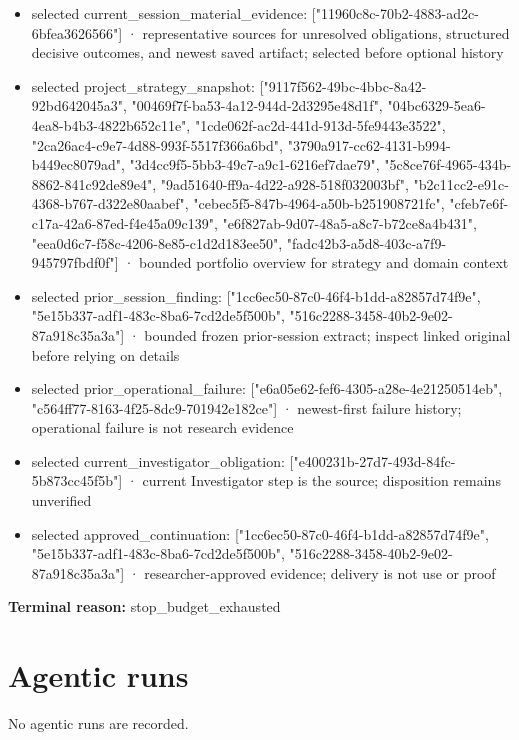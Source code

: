 \documentclass[11pt]{article}
\begin{document}
\begin{itemize}
\item selected current\_session\_material\_evidence: ["11960c8c-70b2-4883-ad2c-6bfea3626566"] · representative sources for unresolved obligations, structured decisive outcomes, and newest saved artifact; selected before optional history
\item selected project\_strategy\_snapshot: ["9117f562-49bc-4bbc-8a42-92bd642045a3", "00469f7f-ba53-4a12-944d-2d3295e48d1f", "04bc6329-5ea6-4ea8-b4b3-4822b652c11e", "1cde062f-ac2d-441d-913d-5fe9443e3522", "2ca26ac4-c9e7-4d88-993f-5517f366a6bd", "3790a917-cc62-4131-b994-b449ec8079ad", "3d4cc9f5-5bb3-49c7-a9c1-6216ef7dae79", "5c8ce76f-4965-434b-8862-841c92de89e4", "9ad51640-ff9a-4d22-a928-518f032003bf", "b2c11cc2-e91c-4368-b767-d322e80aabef", "cebec5f5-847b-4964-a50b-b251908721fc", "cfeb7e6f-c17a-42a6-87ed-f4e45a09c139", "e6f827ab-9d07-48a5-a8c7-b72ce8a4b431", "eea0d6c7-f58c-4206-8e85-c1d2d183ee50", "fadc42b3-a5d8-403c-a7f9-945797fbdf0f"] · bounded portfolio overview for strategy and domain context
\item selected prior\_session\_finding: ["1cc6ec50-87c0-46f4-b1dd-a82857d74f9e", "5e15b337-adf1-483c-8ba6-7cd2de5f500b", "516c2288-3458-40b2-9e02-87a918c35a3a"] · bounded frozen prior-session extract; inspect linked original before relying on details
\item selected prior\_operational\_failure: ["e6a05e62-fef6-4305-a28e-4e21250514eb", "c564ff77-8163-4f25-8dc9-701942e182ce"] · newest-first failure history; operational failure is not research evidence
\item selected current\_investigator\_obligation: ["e400231b-27d7-493d-84fc-5b873cc45f5b"] · current Investigator step is the source; disposition remains unverified
\item selected approved\_continuation: ["1cc6ec50-87c0-46f4-b1dd-a82857d74f9e", "5e15b337-adf1-483c-8ba6-7cd2de5f500b", "516c2288-3458-40b2-9e02-87a918c35a3a"] · researcher-approved evidence; delivery is not use or proof
\end{itemize}
\textbf{Terminal reason:} stop\_budget\_exhausted\par
\section{Agentic runs}
No agentic runs are recorded.\par
\end{document}
